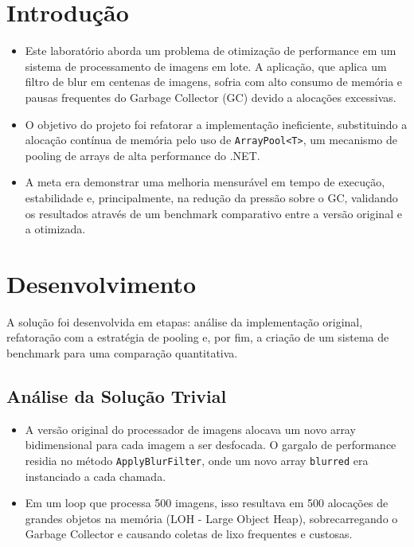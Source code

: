 \documentclass[
	12pt,
	oneside,
	a4paper,
	english,
	brazil,
]{abntex2}
\begin{document}
\frenchspacing
\imprimircapa
\textual

\section{Introdução}
\begin{itemize}
    \item Este laboratório aborda um problema de otimização de performance em um sistema de processamento de imagens em lote. A aplicação, que aplica um filtro de blur em centenas de imagens, sofria com alto consumo de memória e pausas frequentes do Garbage Collector (GC) devido a alocações excessivas.
    \item O objetivo do projeto foi refatorar a implementação ineficiente, substituindo a alocação contínua de memória pelo uso de \texttt{ArrayPool<T>}, um mecanismo de pooling de arrays de alta performance do .NET.
    \item A meta era demonstrar uma melhoria mensurável em tempo de execução, estabilidade e, principalmente, na redução da pressão sobre o GC, validando os resultados através de um benchmark comparativo entre a versão original e a otimizada.
\end{itemize}

\section{Desenvolvimento}

A solução foi desenvolvida em etapas: análise da implementação original, refatoração com a estratégia de pooling e, por fim, a criação de um sistema de benchmark para uma comparação quantitativa.

\subsection{Análise da Solução Trivial}
\begin{itemize}
    \item A versão original do processador de imagens alocava um novo array bidimensional para cada imagem a ser desfocada. O gargalo de performance residia no método \texttt{ApplyBlurFilter}, onde um novo array \texttt{blurred} era instanciado a cada chamada.
    \item Em um loop que processa 500 imagens, isso resultava em 500 alocações de grandes objetos na memória (LOH - Large Object Heap), sobrecarregando o Garbage Collector e causando coletas de lixo frequentes e custosas.
\end{itemize}
\end{document}

